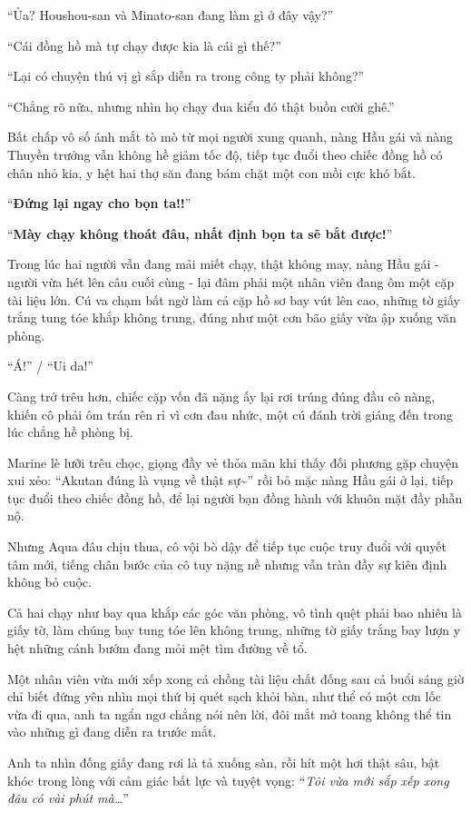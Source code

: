 \documentclass[../main.tex]{subfiles}
\begin{document}
``Ủa? Houshou-san và Minato-san đang làm gì ở đây vậy?''

``Cái đồng hồ mà tự chạy được kia là cái gì thế?''

``Lại có chuyện thú vị gì sắp diễn ra trong công ty phải không?''

``Chẳng rõ nữa, nhưng nhìn họ chạy đua kiểu đó thật buồn cười ghê.''

Bất chấp vô số ánh mắt tò mò từ mọi người xung quanh, nàng Hầu gái và nàng Thuyền trưởng vẫn không hề giảm tốc độ, tiếp tục đuổi theo chiếc đồng hồ có chân nhỏ kia, y hệt hai thợ săn đang bám chặt một con mồi cực khó bắt.

``\textbf{Đứng lại ngay cho bọn ta!!}''

``\textbf{Mày chạy không thoát đâu, nhất định bọn ta sẽ bắt được!}''

Trong lúc hai người vẫn đang mải miết chạy, thật không may, nàng Hầu gái - người vừa hét lên câu cuối cùng - lại đâm phải một nhân viên đang ôm một cặp tài liệu lớn. Cú va chạm bất ngờ làm cả cặp hồ sơ bay vút lên cao, những tờ giấy trắng tung tóe khắp không trung, đúng như một cơn bão giấy vừa ập xuống văn phòng.

``Á!'' / ``Ui da!''

Càng trớ trêu hơn, chiếc cặp vốn đã nặng ấy lại rơi trúng đúng đầu cô nàng, khiến cô phải ôm trán rên rỉ vì cơn đau nhức, một cú đánh trời giáng đến trong lúc chẳng hề phòng bị.

Marine lè lưỡi trêu chọc, giọng đầy vẻ thỏa mãn khi thấy đối phương gặp chuyện xui xẻo: ``Akutan đúng là vụng về thật sự\~{}'' rồi bỏ mặc nàng Hầu gái ở lại, tiếp tục đuổi theo chiếc đồng hồ, để lại người bạn đồng hành với khuôn mặt đầy phẫn nộ.

Nhưng Aqua đâu chịu thua, cô vội bò dậy để tiếp tục cuộc truy đuổi với quyết tâm mới, tiếng chân bước của cô tuy nặng nề nhưng vẫn tràn đầy sự kiên định không bỏ cuộc.

Cả hai chạy như bay qua khắp các góc văn phòng, vô tình quệt phải bao nhiêu là giấy tờ, làm chúng bay tung tóe lên không trung, những tờ giấy trắng bay lượn y hệt những cánh bướm đang mỏi mệt tìm đường về tổ.

Một nhân viên vừa mới xếp xong cả chồng tài liệu chất đống sau cả buổi sáng giờ chỉ biết đứng yên nhìn mọi thứ bị quét sạch khỏi bàn, như thể có một cơn lốc vừa đi qua, anh ta ngẩn ngơ chẳng nói nên lời, đôi mắt mở toang không thể tin vào những gì đang diễn ra trước mắt.

Anh ta nhìn đống giấy đang rơi lả tả xuống sàn, rồi hít một hơi thật sâu, bật khóc trong lòng với cảm giác bất lực và tuyệt vọng: ``\textit{Tôi vừa mới sắp xếp xong đâu có vài phút mà\dots}''
\end{document}
